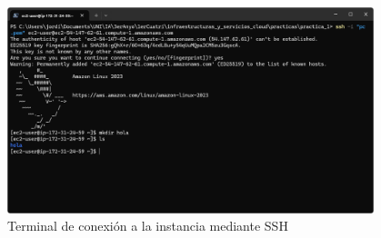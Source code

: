 \documentclass{article}
\begin{document}
	\begin{figure}[H]
	\centering
	\includegraphics[width=0.95\textwidth]{tarea_final_2.png}
	\caption{Terminal de conexión a la instancia mediante SSH}
	\end{figure}
\end{document}
